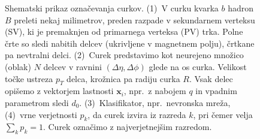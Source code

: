 \documentclass[slovene,11pt,a4paper]{article}
\begin{document}
\begin{figure}[htb]
\caption{Shematski prikaz označevanja curkov. (1)~V curku kvarka $b$ hadron $B$ preleti nekaj milimetrov, preden razpade v sekundarnem verteksu (SV), ki je premaknjen od primarnega verteksa (PV) trka. Polne črte so sledi nabitih delcev (ukrivljene v magnetnem polju), črtkane pa nevtralni delci. (2)~Curek predstavimo kot neurejeno množico (oblak) $N$ delcev v ravnini $(\Delta\eta, \Delta\phi)$ glede na os curka. Velikost točke ustreza $p_T$ delca, krožnica pa radiju curka $R$. Vsak delec opišemo z vektorjem lastnosti $\mathbf{x}_i$, npr.\ z nabojem $q$ in vpadnim parametrom sledi $d_0$. (3)~Klasifikator, npr.\ nevronska mreža, (4)~vrne verjetnosti $p_k$, da curek izvira iz razreda $k$, pri čemer velja $\sum_k p_k = 1$. Curek označimo z najverjetnejšim razredom.}
\label{fig:tagging}
\end{figure}

\newpage
\end{document}
